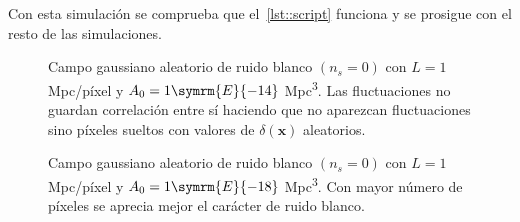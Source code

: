 Con esta simulación se comprueba que el~\autoref{lst::script} funciona y se prosigue con el resto de las simulaciones.
\begin{figure}[h!]
    \centering
    {}
    \caption[Ruido blanco \(N=32\) píxeles]{Campo gaussiano aleatorio de ruido blanco \((n_s=0)\) con \(L=1\) Mpc/píxel y \(A_0=1\symrm{E}{-14}\) Mpc\textsuperscript{3}. Las fluctuaciones no guardan correlación entre sí haciendo que no aparezcan fluctuaciones sino píxeles sueltos con valores de \(\delta(\symbf{x})\) aleatorios.}
    \label{fig::ruidoblanco32}
\end{figure}
\begin{figure}[t!]
    \centering
    {}
    \caption[Ruido blanco \(N=256\) píxeles]{Campo gaussiano aleatorio de ruido blanco \((n_s=0)\) con \(L=1\) Mpc/píxel y \(A_0=1\symrm{E}{-18}\) Mpc\textsuperscript{3}. Con mayor número de píxeles se aprecia mejor el carácter de ruido blanco.}
    \label{fig::ruidoblanco128}
\end{figure}
\newpage
